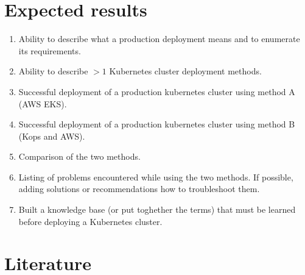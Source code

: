 \documentclass[12pt]{article}
\begin{document}
\section{Expected results}
\begin{enumerate}
    \item Ability to describe what a production deployment means and to enumerate its requirements.
    \item Ability to describe $>1$ Kubernetes cluster deployment methods.
    \item Successful deployment of a production kubernetes cluster using method A (AWS EKS).
    \item Successful deployment of a production kubernetes cluster using method B (Kops and AWS).
    \item Comparison of the two methods.
    \item Listing of problems encountered while using the two methods. If possible, adding solutions or recommendations how to troubleshoot them.
    \item Built a knowledge base (or put toghether the terms) that must be learned before deploying a Kubernetes cluster.
\end{enumerate}

\newpage

\section{Literature}
\end{document}
